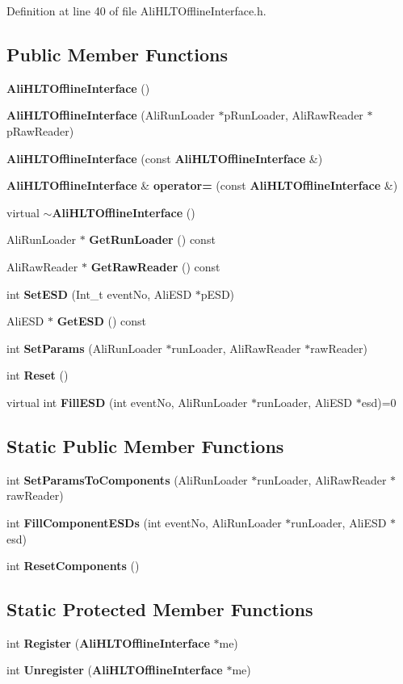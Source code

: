Definition at line 40 of file Ali\-HLTOffline\-Interface.h.\subsection*{Public Member Functions}
\begin{CompactItemize}
\item 
{\bf Ali\-HLTOffline\-Interface} ()
\item 
{\bf Ali\-HLTOffline\-Interface} (Ali\-Run\-Loader $\ast$p\-Run\-Loader, Ali\-Raw\-Reader $\ast$p\-Raw\-Reader)
\item 
{\bf Ali\-HLTOffline\-Interface} (const {\bf Ali\-HLTOffline\-Interface} \&)
\item 
{\bf Ali\-HLTOffline\-Interface} \& {\bf operator=} (const {\bf Ali\-HLTOffline\-Interface} \&)
\item 
virtual {\bf $\sim$Ali\-HLTOffline\-Interface} ()
\item 
Ali\-Run\-Loader $\ast$ {\bf Get\-Run\-Loader} () const 
\item 
Ali\-Raw\-Reader $\ast$ {\bf Get\-Raw\-Reader} () const 
\item 
int {\bf Set\-ESD} (Int\_\-t event\-No, Ali\-ESD $\ast$p\-ESD)
\item 
Ali\-ESD $\ast$ {\bf Get\-ESD} () const 
\item 
int {\bf Set\-Params} (Ali\-Run\-Loader $\ast$run\-Loader, Ali\-Raw\-Reader $\ast$raw\-Reader)
\item 
int {\bf Reset} ()
\item 
virtual int {\bf Fill\-ESD} (int event\-No, Ali\-Run\-Loader $\ast$run\-Loader, Ali\-ESD $\ast$esd)=0
\end{CompactItemize}
\subsection*{Static Public Member Functions}
\begin{CompactItemize}
\item 
int {\bf Set\-Params\-To\-Components} (Ali\-Run\-Loader $\ast$run\-Loader, Ali\-Raw\-Reader $\ast$raw\-Reader)
\item 
int {\bf Fill\-Component\-ESDs} (int event\-No, Ali\-Run\-Loader $\ast$run\-Loader, Ali\-ESD $\ast$esd)
\item 
int {\bf Reset\-Components} ()
\end{CompactItemize}
\subsection*{Static Protected Member Functions}
\begin{CompactItemize}
\item 
int {\bf Register} ({\bf Ali\-HLTOffline\-Interface} $\ast$me)
\item 
int {\bf Unregister} ({\bf Ali\-HLTOffline\-Interface} $\ast$me)
\end{CompactItemize}

